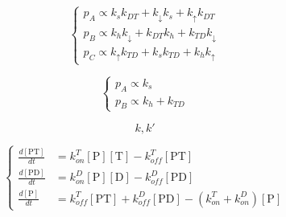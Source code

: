 \documentclass{article}
\begin{document}
\begin{equation}
\begin{cases}
    p_A \propto k_s k_{DT} + k_\downarrow k_s + k_\uparrow k_{DT} \\
    p_B \propto k_h k_\downarrow + k_{DT} k_h + k_{TD} k_\downarrow \\
    p_C \propto k_\uparrow k_{TD} + k_s k_{TD} + k_h k_\uparrow
\end{cases}
\end{equation}

\begin{equation}
\begin{cases}
    p_A \propto k_s \\
    p_B \propto k_h + k_{TD}
\end{cases}
\end{equation}

$$
k, k'
$$

\begin{equation}
\left\{
\begin{split}
    \frac{d[\text{PT}]}{dt} &= k_{on}^T [\text{P}][\text{T}] - k_{off}^T [\text{PT}] \\
    \frac{d[\text{PD}]}{dt} &= k_{on}^D [\text{P}][\text{D}] - k_{off}^D [\text{PD}] \\
    \frac{d[\text{P}]}{dt} &= k_{off}^T [\text{PT}] + k_{off}^D [\text{PD}] - (k_{on}^T + k_{on}^D) [\text{P}]
\end{split}
\right.
\end{equation}
\end{document}
